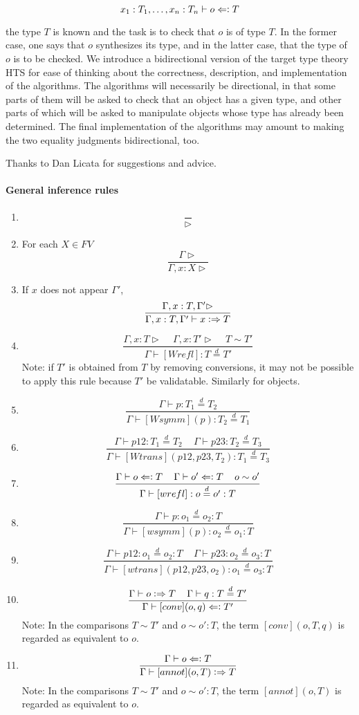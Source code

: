 \documentclass[11pt]{article}
\newcommand{\eqd}{\stackrel{d}{=}}
\newcommand{\spc}{{\,\,\,\,\,\,\,}}
\newcommand{\synth}{\vcentcolon\Rightarrow}
\newcommand{\force}{\Leftarrow\vcentcolon}
\begin{document}
$$x_1:T_1,\dots,x_n:T_n\vdash o \force T$$

the type $T$ is known and the task is to check that $o$ is of type $T$.  In the
former case, one says that $o$ synthesizes its type, and in the latter case,
that the type of $o$ is to be checked.  We introduce a bidirectional version of
the target type theory HTS for ease of thinking about the correctness,
description, and implementation of the algorithms.  The algorithms will
necessarily be directional, in that some parts of them will be asked to check
that an object has a given type, and other parts of which will be asked to
manipulate objects whose type has already been determined.  The final
implementation of the algorithms may amount to making the two equality
judgments bidirectional, too.

Thanks to Dan Licata for suggestions and advice.

\paragraph{General inference rules} 

\begin{enumerate}
\item 
$$\frac{}{\rhd}$$
\item For each $X\in FV$
$$\frac{\Gamma\rhd}{\Gamma, x:X\rhd}$$

\item If $x$ does not appear $\Gamma'$,
$$\frac{\Gamma, x:T, \Gamma'\rhd}{\Gamma, x:T, \Gamma'\vdash x \synth T}$$

\item 
$$\frac{\Gamma, x:T\rhd\spc \Gamma, x:T'\rhd\spc T\sim T'}{\Gamma\vdash [Wrefl]: T\eqd T'}$$
Note: if $T'$ is obtained from $T$ by removing conversions, it may not be possible to apply
this rule because $T'$ be validatable.  Similarly for objects.
\item 
$$\frac{\Gamma\vdash p:T_1\eqd T_2}{\Gamma\vdash [Wsymm](p):T_2\eqd T_1}$$
\item 
$$\frac{\Gamma\vdash p12:T_1\eqd T_2\spc\Gamma\vdash p23:T_2\eqd T_3}{\Gamma\vdash [Wtrans](p12,p23,T_2): T_1\eqd T_3}$$
\item 
$$\frac{\Gamma\vdash o \force T\spc\Gamma\vdash o' \force T \spc o \sim o'}{\Gamma\vdash [wrefl]:o\eqd o':T}$$
\item 
$$\frac{\Gamma\vdash p:o_1\eqd o_2:T}{\Gamma\vdash [wsymm](p):o_2\eqd o_1:T}$$
\item 
$$\frac{\Gamma\vdash p12:o_1\eqd o_2:T\spc\Gamma\vdash p23:o_2\eqd o_3:T}{\Gamma\vdash [wtrans](p12,p23,o_2):o_1\eqd o_3:T}$$
\item 
$$\frac{\Gamma\vdash o \synth T\spc \Gamma\vdash q : T\eqd T'}{\Gamma\vdash [conv](o,q) \force T'}$$
Note: In the comparisons $T\sim T'$ and $o\sim o':T$, the term $[conv](o,T,q)$ is regarded as equivalent to $o$.
\item 
$$\frac{\Gamma\vdash o \force T}{\Gamma\vdash [annot](o,T) \synth T}$$
Note: In the comparisons $T\sim T'$ and $o\sim o':T$, the term $[annot](o,T)$ is regarded as equivalent to $o$.

\end{enumerate}
\end{document}
